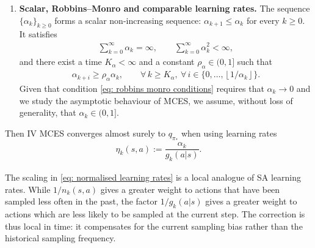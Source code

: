 \documentclass{article}
\begin{document}
\begin{theorem}
\begin{enumerate}[label=(\arabic*)]
    \item \textbf{Scalar, Robbins--Monro and comparable learning rates.} 
    The sequence $\{\alpha_k\}_{k \ge 0}$ forms a scalar non-increasing sequence: $\alpha_{k+1} \leq \alpha_k$ for every $k \ge 0$.
    It satisfies
    \begin{align}
    \label{eq: robbins monro conditions}
        \sum_{k =0}^\infty \alpha_k = \infty , 
        \qquad
        \sum_{k =0}^\infty \alpha_k^2 < \infty ,
    \end{align}
    and there exist a time $K_\alpha < \infty$ and a constant $\rho_\alpha \in(0,1]$ such that
    \begin{align}
    \label{eq: comparability of learning rates}
    \alpha_{k+i} \ge \rho_\alpha \alpha_k ,
    \qquad
    \forall \, k \ge K_\alpha, \
    \forall \, i \in \{0, \dots, \left\lfloor 1 / \alpha_k \right\rfloor\} .
    \end{align}
    Given that condition \eqref{eq: robbins monro conditions} requires that $\alpha_k \to 0$ and we study the asymptotic behaviour of MCES, we assume, without loss of generality, that $\alpha_k \in (0, 1]$.
\end{enumerate}
Then IV MCES converges almost surely to $q_{\pi_*}$ when using learning rates
\begin{align}
\label{eq: normalised learning rates}
\eta_k(s,a) := \dfrac{\alpha_k}{g_k(a|s)} .
\end{align}
\end{theorem}


The scaling in \eqref{eq: normalised learning rates} is a local analogue of SA learning rates.
While $1/n_k(s,a)$ gives a greater weight to actions that have been sampled less often in the past,
the factor $1/g_k(a|s)$ gives a greater weight to actions which are less likely to be sampled at the current step.
The correction is thus local in time: it compensates for the current sampling bias rather than the historical sampling frequency.
\end{document}
